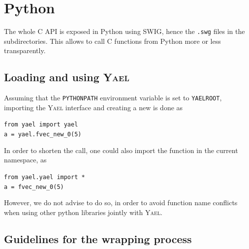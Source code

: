 \documentclass[a4paper,11pt,notitlepage,final,twoside]{report}
\newcommand{\yael}{\textsc{Yael}\xspace}
\newcommand{\yroot}{\texttt{YAELROOT}\xspace}
\newcommand{\tc}[1]{\texttt{#1}}
\newcommand{\code}[1]{\smallskip 

\texttt{#1} 
 \medskip

}
\begin{document}
\chapter{Python}

The whole C API is exposed in Python using SWIG, hence the \tc{.swg} files in the subdirectories. This allows to call C functions from Python more or less transparently. 


\section{Loading and using \yael}

Assuming that the \tc{PYTHONPATH} environment variable is set to \yroot, 
importing the \yael interface and creating a new is done as 
\code{from yael import yael  \\
a = yael.fvec\_new\_0(5)
}

In order to shorten the call, one could also import the function 
in the current namespace, as
\code{from yael.yael import * \\
a = fvec\_new\_0(5)
}

However, we do not advise to do so, in order to avoid function name conflicts 
when using other python libraries jointly with \yael. 

\section{Guidelines for the wrapping process}
\end{document}

